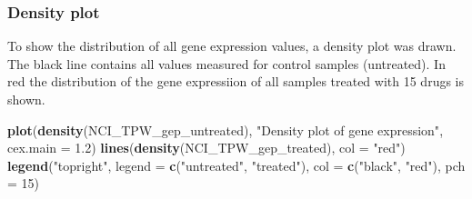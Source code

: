 \documentclass[]{article}
\newenvironment{Shaded}{\begin{snugshade}}{\end{snugshade}}
\newcommand{\CommentTok}[1]{\textcolor[rgb]{0.56,0.35,0.01}{\textit{#1}}}
\newcommand{\ControlFlowTok}[1]{\textcolor[rgb]{0.13,0.29,0.53}{\textbf{#1}}}
\newcommand{\DataTypeTok}[1]{\textcolor[rgb]{0.13,0.29,0.53}{#1}}
\newcommand{\DecValTok}[1]{\textcolor[rgb]{0.00,0.00,0.81}{#1}}
\newcommand{\FloatTok}[1]{\textcolor[rgb]{0.00,0.00,0.81}{#1}}
\newcommand{\KeywordTok}[1]{\textcolor[rgb]{0.13,0.29,0.53}{\textbf{#1}}}
\newcommand{\NormalTok}[1]{#1}
\newcommand{\OperatorTok}[1]{\textcolor[rgb]{0.81,0.36,0.00}{\textbf{#1}}}
\newcommand{\StringTok}[1]{\textcolor[rgb]{0.31,0.60,0.02}{#1}}
\begin{document}
\begin{Shaded}
\end{Shaded}

\hypertarget{density-plot}{%
\subsubsection{Density plot}\label{density-plot}}

To show the distribution of all gene expression values, a density plot
was drawn. The black line contains all values measured for control
samples (untreated). In red the distribution of the gene expressiion of
all samples treated with 15 drugs is shown.

\begin{Shaded}
\begin{Highlighting}[]
\KeywordTok{plot}\NormalTok{(}\KeywordTok{density}\NormalTok{(NCI_TPW_gep_untreated), }
     \StringTok{"Density plot of gene expression"}\NormalTok{, }
     \DataTypeTok{cex.main =} \FloatTok{1.2}\NormalTok{)}
\KeywordTok{lines}\NormalTok{(}\KeywordTok{density}\NormalTok{(NCI_TPW_gep_treated), }\DataTypeTok{col =} \StringTok{"red"}\NormalTok{)}
\KeywordTok{legend}\NormalTok{(}\StringTok{"topright"}\NormalTok{, }
       \DataTypeTok{legend =} \KeywordTok{c}\NormalTok{(}\StringTok{"untreated"}\NormalTok{, }\StringTok{"treated"}\NormalTok{), }
       \DataTypeTok{col =} \KeywordTok{c}\NormalTok{(}\StringTok{"black"}\NormalTok{, }\StringTok{"red"}\NormalTok{), }
       \DataTypeTok{pch =} \DecValTok{15}\NormalTok{)}
\end{Highlighting}
\end{Shaded}
\end{document}
